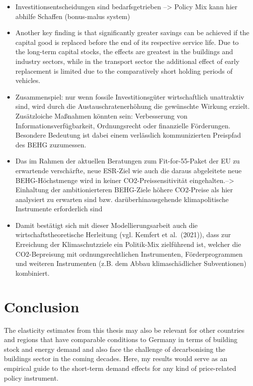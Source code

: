 \documentclass[12pt,twoside]{reedthesis}
\begin{document}
\begin{itemize}
\item
  Investitionsentscheidungen sind bedarfsgetrieben --\textgreater{} Policy Mix kann hier abhilfe Schaffen (bonus-malus system)
\item
  Another key finding is that significantly greater savings can be achieved if the capital good is replaced before the end of its respective service life. Due to the long-term capital stocks, the effects are greatest in the buildings and industry sectors, while in the transport sector the additional effect of early replacement is limited due to the comparatively short holding periods of vehicles.
\item
  Zusammenspiel: nur wenn fossile Investitionsgüter wirtschaftlich unattraktiv sind, wird durch die Austauschratenerhöhung die gewünschte Wirkung erzielt. Zusätzloiche Maßnahmen könnten sein: Verbesserung von Informationsverfügbarkeit, Ordnungsrecht oder finanzielle Förderungen. Besondere Bedeutung ist dabei einem verlässlich kommunizierten Preispfad des BEHG zuzumessen.
\item
  Das im Rahmen der aktuellen Beratungen zum Fit-for-55-Paket der EU zu erwartende verschärfte, neue ESR-Ziel wie auch die daraus abgeleitete neue BEHG-Höchstmenge wird in keiner CO2-Preissensitivität eingehalten.--\textgreater{} Einhaltung der ambitionierteren BEHG-Ziele höhere CO2-Preise als hier analysiert zu erwarten sind bzw. darüberhinausgehende klimapolitische Instrumente erforderlich sind
\item
  Damit bestätigt sich mit dieser Modellierungsarbeit auch die wirtschaftstheoretische Herleitung (vgl. Kemfert et al.~(2021)), dass zur Erreichung der Klimaschutzziele ein Politik-Mix zielführend ist, welcher die CO2-Bepreisung mit ordnungsrechtlichen Instrumenten, Förderprogrammen und weiteren Instrumenten (z.B. dem Abbau klimaschädlicher Subventionen) kombiniert.
\end{itemize}
\hypertarget{conclusion}{%
\chapter{Conclusion}\label{conclusion}}

The elasticity estimates from this thesis may also be relevant for other countries and regions that have comparable conditions to Germany in terms of building stock and energy demand and also face the challenge of decarbonising the buildings sector in the coming decades. Here, my results would serve as an empirical guide to the short-term demand effects for any kind of price-related policy instrument.
\end{document}
